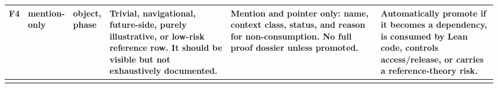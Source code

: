 \begin{longtable}{L{0.035\linewidth} L{0.06\linewidth} L{0.06\linewidth} L{0.255\linewidth} L{0.31\linewidth} L{0.24\linewidth}}
\hline
\addlinespace[0.24em]
F4 & mention-only & object, phase & Trivial, navigational, future-side, purely illustrative, or low-risk reference row. It should be visible but not exhaustively documented. & Mention and pointer only: name, context class, status, and reason for non-consumption. No full proof dossier unless promoted. & Automatically promote if it becomes a dependency, is consumed by Lean code, controls access/\allowbreak{}release, or carries a reference-theory risk.\\
\hline
\addlinespace[0.24em]
\end{longtable}
\normalsize
